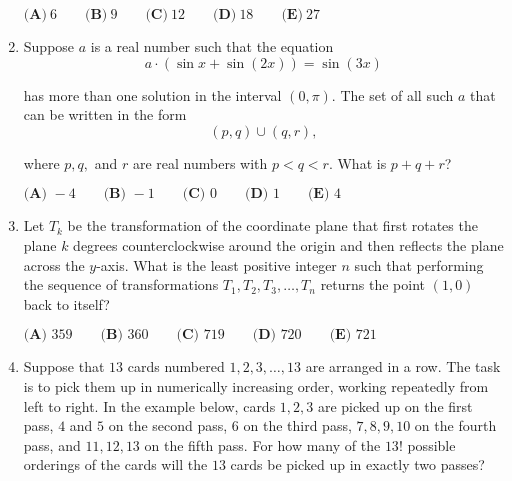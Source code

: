\documentclass{article}
\begin{document}
\begin{enumerate}[label=\arabic*., itemsep=0.5em]
\(\textbf{(A)} ~6 \qquad\textbf{(B)} ~9 \qquad\textbf{(C)} ~12 \qquad\textbf{(D)} ~18 \qquad\textbf{(E)} ~27 \)\par \vspace{0.5em}\item Suppose \(a\) is a real number such that the equation 
\begin{equation*}
a\cdot(\sin{x}+\sin{(2x)}) = \sin{(3x)}
\end{equation*}

has more than one solution in the interval \((0, \pi)\). The set of all such \(a\) that can be written
in the form 
\begin{equation*}
(p,q) \cup (q,r),
\end{equation*}

where \(p, q,\) and \(r\) are real numbers with \(p < q< r\). What is \(p+q+r\)?

\(\textbf{(A) } {-}4 \qquad \textbf{(B) } {-}1 \qquad \textbf{(C) } 0 \qquad \textbf{(D) } 1 \qquad \textbf{(E) } 4\)\par \vspace{0.5em}\item Let \(T_k\) be the transformation of the coordinate plane that first rotates the plane \(k\) degrees counterclockwise around the origin and then reflects the plane across the \(y\)-axis. What is the least positive integer \(n\) such that performing the sequence of transformations \(T_1, T_2, T_3, \dots, T_n\) returns the point \((1,0)\) back to itself?

\(\textbf{(A) } 359 \qquad \textbf{(B) } 360\qquad \textbf{(C) } 719 \qquad \textbf{(D) } 720 \qquad \textbf{(E) } 721\)\par \vspace{0.5em}\item Suppose that \(13\) cards numbered \(1, 2, 3, \ldots, 13\) are arranged in a row. The task is to pick them up in numerically increasing order, working repeatedly from left to right. In the example below, cards \(1, 2, 3\) are picked up on the first pass, \(4\) and \(5\) on the second pass, \(6\) on the third pass, \(7, 8, 9, 10\) on the fourth pass, and \(11, 12, 13\) on the fifth pass. For how many of the \(13!\) possible orderings of the cards will the \(13\) cards be picked up in exactly two passes?



\end{enumerate}
\end{document}
